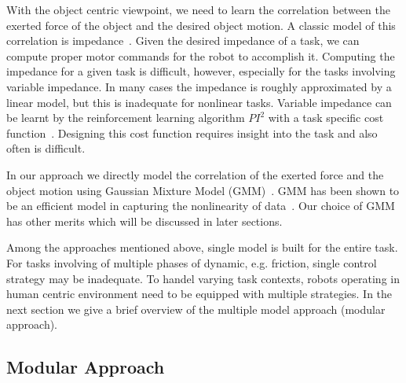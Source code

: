 With the object centric viewpoint, we need to learn the correlation between the exerted force of the object and the desired object motion. A classic model of this correlation is impedance~\cite{howard2010transferring,wimbock2012comparison}. Given the desired impedance of a task, we can compute proper motor commands for the robot to accomplish it. Computing the impedance for a given task is difficult, however, especially for the tasks involving variable impedance.
In many cases the impedance is roughly approximated by a linear model, but this is inadequate for nonlinear tasks.  Variable impedance can be learnt by the reinforcement learning algorithm $PI^2$ with a task specific cost function~\cite{buchli2011learning}. Designing this cost function requires insight into the task and also often is difficult.



In our approach we directly model the correlation of the exerted force and the object motion using Gaussian Mixture Model (GMM)~\cite{cohn1996active}. GMM has been shown to be an efficient model in capturing the nonlinearity of data~\cite{huang2013learning,sauser2011iterative,calinon2007incremental}. Our choice of GMM has other merits which will be discussed in later sections.

Among the approaches mentioned above, single model is built for the entire task. For tasks involving of multiple phases of dynamic, e.g. friction, single control strategy may be inadequate. To handel varying task contexts, robots operating in human centric environment need to be equipped with multiple strategies. In the next section we give a brief overview of the multiple model approach (modular approach).


\subsection{Modular Approach}


